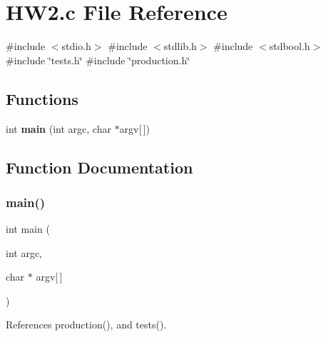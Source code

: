 \section{H\+W2.\+c File Reference}
\label{HW2_8c}
{\ttfamily \#include $<$stdio.\+h$>$}\newline
{\ttfamily \#include $<$stdlib.\+h$>$}\newline
{\ttfamily \#include $<$stdbool.\+h$>$}\newline
{\ttfamily \#include \char`\"{}tests.\+h\char`\"{}}\newline
{\ttfamily \#include \char`\"{}production.\+h\char`\"{}}\newline
\subsection*{Functions}
\begin{DoxyCompactItemize}
\item 
int \textbf{ main} (int argc, char $\ast$argv[$\,$])
\end{DoxyCompactItemize}


\subsection{Function Documentation}
\mbox{\label{HW2_8c_a0ddf1224851353fc92bfbff6f499fa97}} 
\subsubsection{main()}
{\footnotesize\ttfamily int main (\begin{DoxyParamCaption}\item[{int}]{argc,  }\item[{char $\ast$}]{argv[$\,$] }\end{DoxyParamCaption})}



References production(), and tests().

